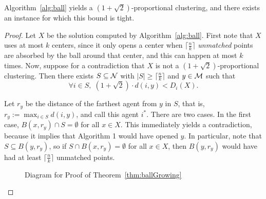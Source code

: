 \begin{theorem}
\label{thm:ballGrowing}
	Algorithm~\ref{alg:ball} yields a $(1+\sqrt{2})$-proportional clustering, and there exists an instance for which this bound is tight.
\end{theorem}
\begin{proof}
	Let $X$ be the solution computed by Algorithm~\ref{alg:ball}. First note that $X$ uses at most $k$ centers, since it only opens a center when $\lceil \frac{n}{k} \rceil$ \textit{unmatched} points are absorbed by the ball around that center, and this can happen at most $k$ times. Now, suppose for a contradiction that $X$ is not a $(1+\sqrt{2})$-proportional clustering. Then there exists $S \subseteq \mathcal {N}$ with $|S| \geq \lceil \frac{n}{k} \rceil$ and $y \in \mathcal{M}$ such that \begin{equation} \label{eq:contradiction} \forall i \in S, \; (1+\sqrt{2}) \cdot d(i, y) < D_i(X).\end{equation} 

Let $r_y$ be the distance of the farthest agent from $y$ in $S$, that is, $r_y := \max_{i \in S} d(i, y)$, and call this agent $i^*$. There are two cases. In the first case, $B(x, r_y) \cap S = \emptyset$ for all $x \in X$. This immediately yields a contradiction, because it implies that Algorithm 1 would have opened $y$. In particular, note that $S \subseteq B(y, r_y)$, so if $S \cap B(x, r_y) = \emptyset$ for all $x \in X$, then $B(y, r_y)$ would have had at least $\lceil \frac{n}{k} \rceil$ unmatched points.

\begin{figure}[!h]
\centering
{}
\caption{Diagram for Proof of Theorem~\ref{thm:ballGrowing}}
\label{fig:ballProof}
\end{figure}


\end{proof}
